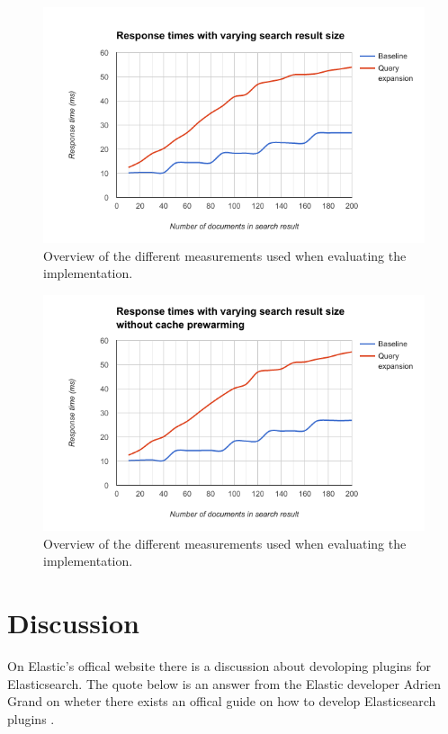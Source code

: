 \begin{figure}[h!]
  \centering \includegraphics[width=1\linewidth]{img/result-vary-result-size.png}
  \caption{Overview of the different measurements used when evaluating the implementation.}
  \label{fig:result-vary-result-size}
\end{figure}

\begin{figure}[h!]
  \centering \includegraphics[width=1\linewidth]{img/result-vary-result-size-without-cache.png}
  \caption{Overview of the different measurements used when evaluating the implementation.}
  \label{fig:result-vary-result-size}
\end{figure}

\section{Discussion}
\label{sec:discussion}
On Elastic's offical website there is a discussion about devoloping plugins for Elasticsearch.
The quote below is an answer from the Elastic developer Adrien Grand on wheter there exists an offical guide on how to develop Elasticsearch plugins \cite{elasticsearch-plugin-quote}.

